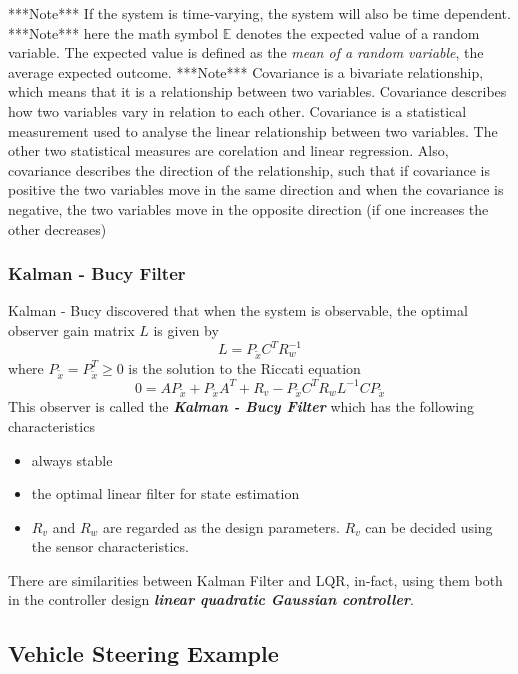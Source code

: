 ***Note*** If the system is time-varying, the system will also be time dependent.
***Note*** here the math symbol $\mathbb{E}$ denotes the expected value of a random variable. The expected value is defined as the \textit{mean of a random variable}, the average expected outcome.
***Note*** Covariance is a bivariate relationship, which means that it is a relationship between two variables. Covariance describes how two variables vary in relation to each other. Covariance is a statistical measurement used to analyse the linear relationship between two variables. The other two statistical measures are corelation and linear regression. Also, covariance describes the direction of the relationship, such that if covariance is positive the two variables move in the same direction and when the covariance is negative, the two variables move in the opposite direction (if one increases the other decreases)

\subsubsection{Kalman - Bucy Filter}

Kalman - Bucy discovered that when the system is observable, the optimal observer gain matrix $L$ is given by
\begin{equation}
	L = P_{\tilde{x}} C^{T} R_{w}^{-1}
\end{equation}
where $P_{\tilde{x}} = P^{T}_{\tilde{x}} \geq 0$ is the solution to the Riccati equation
\begin{equation}
	0 = A P_{\tilde{x}} + P_{\tilde{x}} A^{T} + R_{v} - P_{\tilde{x}}C^{T}R_{w}L^{-1}CP_{\tilde{x}}
\end{equation}
This observer is called the \textbf{\textit{Kalman - Bucy Filter}} which has the following characteristics
\begin{itemize}
	\item always stable
	\item the optimal linear filter for state estimation
	\item  $R_{v}$ and $R_{w}$ are regarded as the design parameters. $R_{v}$ can be decided using the sensor characteristics.
\end{itemize}
There are similarities between Kalman Filter and LQR, in-fact, using them both in the controller design \textbf{\textit{linear quadratic Gaussian controller}}.

\subsection{Vehicle Steering Example}

